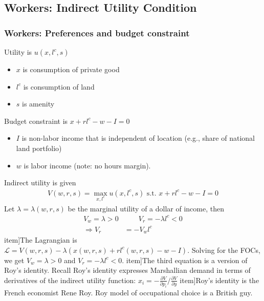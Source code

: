 \documentclass[10pt,notes=hide]{beamer}
\begin{document}
\subsection{Workers: Indirect Utility Condition}
\begin{frame}
\frametitle{Workers: Preferences and budget constraint}
Utility is $u(x, l^c, s)$
\begin{itemize}
\item  $x$ is consumption of private good
\item  $l^c$ is consumption of land
\item  $s$ is amenity
\end{itemize}
Budget constraint is $x + rl^c - w - I = 0$
\begin{itemize}
\item $I$ is non-labor income that is independent of location (e.g., share of national land portfolio)
\item $w$ is labor income (note: no hours margin).
\end{itemize}
Indirect utility is given
\begin{align*}
V(w, r, s)  = \max_{x, l^c} u(x, l^c, s) \text{ s.t. }  x + rl^c - w - I = 0
\end{align*}
Let $\lambda  = \lambda(w, r, s)$ be the marginal utility of a dollar of income, then 
\begin{align*}
V_w = \lambda >0
& \qquad 
V_r = -\lambda l^c <0 
\\
\Rightarrow
V_r &= - V_w l^c
\end{align*}
item]{The Lagrangian is $\mathcal{L} = V(w, r, s) - \lambda(x(w, r, s) + rl^c(w, r, s) - w - I)$. Solving for the FOCs, we get $V_w = \lambda >0$ and $V_r = -\lambda l^c <0$.}
item]{The third equation is a version of Roy's identity. Recall Roy's identity expresses Marshallian demand in terms of derivatives of the indirect utility function: $x_{i} = - \frac{\partial V}{\partial p_{i}} / \frac{\partial V}{\partial y}$}
item]{Roy's identity is the French economist Rene Roy. Roy model of occupational choice is a British guy.}
\end{frame}
\end{document}
